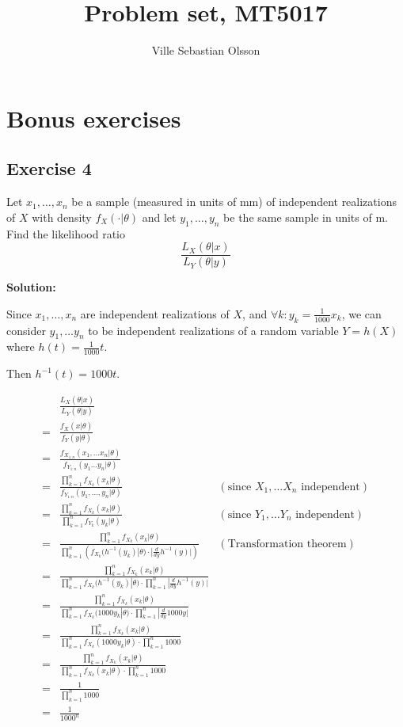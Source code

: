 \documentclass{article}
\title{Problem set, MT5017}
\author{Ville Sebastian Olsson}
\begin{document}
\maketitle
\tableofcontents

\section{Bonus exercises}
\subsection{Exercise 4}

Let \(x_1,\ldots,x_n\) be a sample (measured in units of mm) of independent
realizations of \(X\) with density \(f_X(\cdot |\theta)\) and let \(y_1, \ldots , y_n\) be the same sample in units of m. Find the likelihood ratio
\[\frac{L_X(\theta|x)}{L_Y(\theta|y)}\]

\textbf{Solution:}

Since \(x_1,\ldots,x_n\) are independent realizations of \(X\), and \(\forall k: y_k=\frac{1}{1000}x_k\), we can consider \(y_1,\ldots y_n\) to be independent realizations of a random variable \(Y=h(X)\) where
\(h(t)=\frac{1}{1000}t\).

Then \(h^{-1}(t) = 1000t\).

\begin{align*}
     & \frac{L_X(\theta|x)}{L_Y(\theta|y)} \\
    =& \frac{f_X(x|\theta)}{f_Y(y|\theta)} \\
    =& \frac{f_{X_{1:n}}(x_1,\ldots x_n|\theta)}{f_{Y_{1:n}}(y_1\ldots y_n|\theta)} \\
    =& \frac{\prod_{k=1}^n f_{X_k}(x_k|\theta)}{f_{Y_{1:n}}(y_1,\ldots,y_n|\theta)} & (\text{since }X_1,\ldots X_n\text{ independent}) \\
    =& \frac{\prod_{k=1}^n f_{X_k}(x_k|\theta)}{\prod_{k=1}^n f_{Y_k}(y_k|\theta)} & (\text{since }Y_1,\ldots Y_n\text{ independent}) \\
    =& \frac{\prod_{k=1}^n f_{X_k}(x_k|\theta)}{\prod_{k=1}^n \left( f_{X_k}(h^{-1}(y_k)|\theta) \cdot |\frac{d}{dy}h^{-1}(y)| \right)} & (\text{Transformation theorem}) \\
    =& \frac{\prod_{k=1}^n f_{X_k}(x_k|\theta)}{\prod_{k=1}^n f_{X_k}(h^{-1}(y_k)|\theta) \cdot \prod_{k=1}^n |\frac{d}{dy}h^{-1}(y)|} \\
    =& \frac{\prod_{k=1}^n f_{X_k}(x_k|\theta)}{\prod_{k=1}^n f_{X_k}(1000y_k|\theta) \cdot \prod_{k=1}^n |\frac{d}{dy}1000y|} \\
    =& \frac{\prod_{k=1}^n f_{X_k}(x_k|\theta)}{\prod_{k=1}^n f_{X_k}(1000y_k|\theta) \cdot \prod_{k=1}^n 1000} \\
    =& \frac{\prod_{k=1}^n f_{X_k}(x_k|\theta)}{\prod_{k=1}^n f_{X_k}(x_k|\theta) \cdot \prod_{k=1}^n 1000} \\
    =& \frac{1}{\prod_{k=1}^n 1000} \\
    =& \frac{1}{1000^n} \\
\end{align*}
\end{document}
